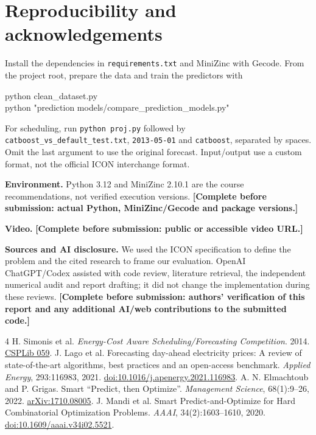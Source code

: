 \documentclass[10pt,a4paper,twocolumn]{article}
\newcommand{\code}[1]{\texttt{#1}}
\newcommand{\pending}[1]{\textcolor{ink}{\textbf{[Complete before submission: #1]}}}
\begin{document}
\section{Reproducibility and acknowledgements}
Install the dependencies in \code{requirements.txt} and MiniZinc with Gecode. From the project root, prepare the data and train the predictors with
\begin{flushleft}\footnotesize\ttfamily
python clean\_dataset.py\\
python "prediction models/\allowbreak{}compare\_prediction\_models.py"
\end{flushleft}
For scheduling, run \code{python proj.py} followed by \code{catboost\_vs\_default\_test.txt}, \code{2013-05-01} and \code{catboost}, separated by spaces. Omit the last argument to use the original forecast. Input/output use a custom format, not the official ICON interchange format.

\textbf{Environment.} Python 3.12 and MiniZinc 2.10.1 are the course recommendations, not verified execution versions. \pending{actual Python, MiniZinc/Gecode and package versions.}

\textbf{Video.} \pending{public or accessible video URL.}

\textbf{Sources and AI disclosure.} We used the ICON specification to define the problem and the cited research to frame our evaluation. OpenAI ChatGPT/Codex assisted with code review, literature retrieval, the independent numerical audit and report drafting; it did not change the implementation during these reviews. \pending{authors' verification of this report and any additional AI/web contributions to the submitted code.}

\vspace{-3pt}
\begin{thebibliography}{4}
\footnotesize\setlength{\itemsep}{1pt}\setlength{\parskip}{0pt}
 H. Simonis et al. \emph{Energy-Cost Aware Scheduling/Forecasting Competition}. 2014. \href{https://www.csplib.org/Problems/prob059/}{CSPLib 059}.
 J. Lago et al. Forecasting day-ahead electricity prices: A review of state-of-the-art algorithms, best practices and an open-access benchmark. \emph{Applied Energy}, 293:116983, 2021. \href{https://doi.org/10.1016/j.apenergy.2021.116983}{doi:10.1016/j.apenergy.2021.116983}.
 A. N. Elmachtoub and P. Grigas. Smart ``Predict, then Optimize''. \emph{Management Science}, 68(1):9--26, 2022. \href{https://arxiv.org/abs/1710.08005}{arXiv:1710.08005}.
 J. Mandi et al. Smart Predict-and-Optimize for Hard Combinatorial Optimization Problems. \emph{AAAI}, 34(2):1603--1610, 2020. \href{https://doi.org/10.1609/aaai.v34i02.5521}{doi:10.1609/aaai.v34i02.5521}.
\end{thebibliography}
\end{document}
